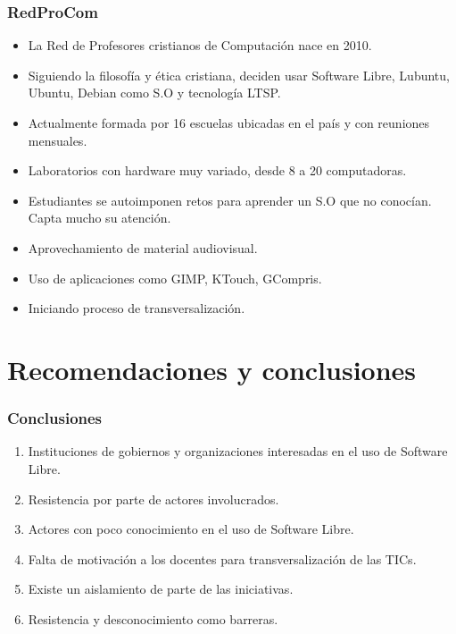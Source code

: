 \documentclass{beamer}
\begin{document}
\begin{frame}
\frametitle{RedProCom}
	\begin{itemize}
		\pause \item La \alert{Red de Profesores cristianos de Computaci\'on} nace en 2010.
		\pause \item Siguiendo la filosof\'ia y \'etica cristiana, deciden usar Software Libre, Lubuntu, Ubuntu, Debian como S.O y tecnolog\'ia LTSP.
		\pause \item Actualmente formada por 16 escuelas ubicadas en el pa\'is y con reuniones mensuales.
		\pause \item Laboratorios con hardware muy variado, desde 8 a 20 computadoras.
		\pause \item Estudiantes se autoimponen retos para aprender un S.O que no conoc\'ian. Capta mucho su atenci\'on.
		\pause \item Aprovechamiento de material audiovisual.
		\pause \item Uso de aplicaciones como GIMP, KTouch, GCompris.
		\pause \item Iniciando proceso de transversalizaci\'on.
	\end{itemize}	
\end{frame}

\section {Recomendaciones y conclusiones}
\begin{frame}
\frametitle{Conclusiones}
	\begin{enumerate}	
		\pause \item Instituciones de gobiernos y organizaciones interesadas en el uso de Software Libre.
		\pause \item Resistencia por parte de actores involucrados.
		\pause \item Actores con poco conocimiento en el uso de Software Libre.
		\pause \item Falta de motivaci\'on a los docentes para transversalizaci\'on de las TICs.
		\pause \item Existe un aislamiento de parte de las iniciativas.
                \pause \item \alert{Resistencia} y \alert{desconocimiento} como barreras.
	\end{enumerate}
\end{frame}
\end{document}
